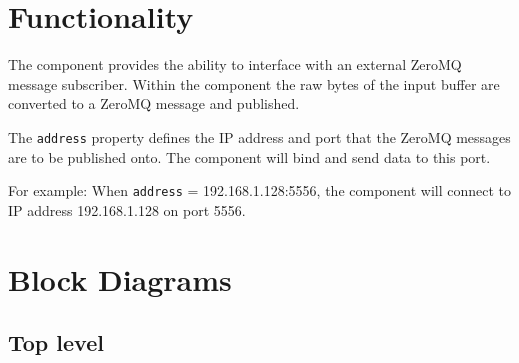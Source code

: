 \def\name{\comp}
\def\workertype{}
\def\version{\ocpiversion}
\def\releasedate{04/2021}
\def\componentlibrary{assets\_{}comps}
\def\workers{\comp{}.rcc}
\def\testedplatforms{ubuntu 18.04}

	
\section*{Functionality}
\begin{flushleft}

The {\comp} component provides the ability to interface with an external ZeroMQ message subscriber. Within the {\comp} component the raw bytes of the input buffer are converted to a ZeroMQ message and published. \newline

The \texttt{address} property defines the IP address and port that the ZeroMQ messages are to be published onto. The {\comp} component will bind and send data to this port.\newline

For example: \newline
When \texttt{address} = 192.168.1.128:5556, the {\comp} component will connect to IP address 192.168.1.128 on port 5556. \newline


\end{flushleft}

\section*{Block Diagrams}
	\subsection*{Top level}
\begin{center}
\end{center}

